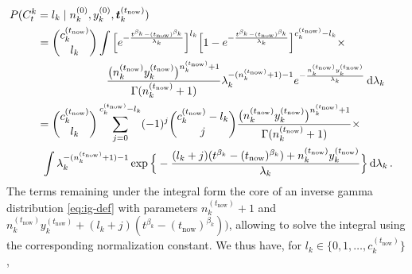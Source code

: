 \documentclass[authoryear]{elsarticle}
\newcommand{\dd}{\,\mathrm{d}}
\renewcommand{\vec}[1]{{\bm#1}}
\newcommand{\uz}{^{(0)}} %
\def\ykz{y\uz_k}
\def\nkz{n\uz_k}
\def\yknow{y_k^{(\tnow)}}
\def\nknow{n_k^{(\tnow)}}
\def\tnow{t_\text{now}}
\def\cknow{c_k^{(\tnow)}}
\def\vectknow{\vec{t}_k^{(\tnow)}}
\begin{document}
\begin{align}
\lefteqn{P(C^k_t = l_k\mid\nkz,\ykz, \vectknow)}\hspace*{5.75ex} \nonumber\\
 &= { \cknow \choose l_k} \int \Big[    e^{-\frac{t^{\beta_k} - (\tnow)^{\beta_k}}{\lambda_k}}\Big]^{l_k}
                               \Big[1 - e^{-\frac{t^{\beta_k} - (\tnow)^{\beta_k}}{\lambda_k}}\Big]^{\cknow - l_k}
    \times \nonumber\\ & \hspace*{14.5ex}
    \frac{\big(\nknow\yknow\big)^{\nknow + 1}}{\Gamma(\nknow + 1)}
    \lambda_k^{-(\nknow + 1) - 1} e^{-\frac{\nknow\yknow}{\lambda_k}} \dd \lambda_k \nonumber\\
 &= { \cknow \choose l_k} \sum_{j=0}^{\cknow - l_k} (-1)^j { \cknow - l_k \choose j}
    \frac{\big(\nknow\yknow\big)^{\nknow + 1}}{\Gamma(\nknow + 1)} 
    \times \nonumber\\ & \hspace*{1ex}
    \int \lambda_k^{-(\nknow + 1) - 1}
    \exp\Big\{-\frac{(l_k + j) (t^{\beta_k} - (\tnow)^{\beta_k}) + \nknow\yknow}{\lambda_k}\Big\} \dd \lambda_k\,.
\end{align}
The terms remaining under the integral form the core of an inverse gamma distribution \eqref{eq:ig-def}
with parameters $\nknow + 1$ and $\nknow\yknow + (l_k + j) (t^{\beta_k} - (\tnow)^{\beta_k}))$,
allowing to solve the integral using the corresponding normalization constant.
We thus have, for $l_k \in \{0,1,\ldots,\cknow\}$,
\end{document}

